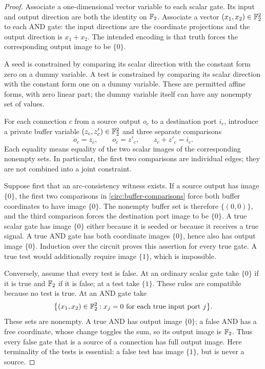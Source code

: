 \begin{proof}
Associate a one-dimensional vector variable to each scalar gate. Its input
and output direction are both the identity on $\mathbb{F}_2$. Associate a vector
$(x_1,x_2)\in\mathbb{F}_2^2$ to each AND gate: the input directions are the coordinate
projections and the output direction is $x_1+x_2$.
The intended encoding is that truth forces the corresponding output image
to be $\{0\}$.

A seed is constrained by comparing its scalar direction with the constant
form zero on a dummy variable. A test is constrained by comparing its scalar
direction with the constant form one on a dummy variable. These are permitted
affine forms, with zero linear part; the dummy variable itself can have any
nonempty set of values.

For each connection $c$ from a source output $o_c$ to a destination port
$i_c$, introduce a private buffer variable $(z_c,z'_c)\in\mathbb{F}_2^2$ and three
separate comparisons
\begin{equation}
\label{circ:buffer-comparisons}
 o_c=z_c,\qquad o_c=z'_c,\qquad z_c+z'_c=i_c.
\end{equation}
Each equality means equality of the two scalar images of the corresponding
nonempty sets. In particular, the first two comparisons are individual
edges; they are not combined into a joint constraint.

Suppose first that an arc-consistency witness exists. If a source output has
image $\{0\}$, the first two comparisons in
\eqref{circ:buffer-comparisons} force both buffer coordinates to have image
$\{0\}$. The nonempty buffer set is therefore $\{(0,0)\}$, and the third
comparison forces the destination port image to be $\{0\}$. A true scalar
gate has image $\{0\}$ either because it is seeded or because it receives a
true signal. A true AND gate has both coordinate images $\{0\}$, hence also
has output image $\{0\}$. Induction over the circuit proves this assertion
for every true gate. A true test would additionally require image $\{1\}$,
which is impossible.

Conversely, assume that every test is false. At an ordinary scalar gate take
$\{0\}$ if it is true and $\mathbb{F}_2$ if it is false; at a test take $\{1\}$.
These rules are compatible because no test is true. At an AND gate take
\[
 \bigl\{(x_1,x_2)\in\mathbb{F}_2^2:
       x_j=0\text{ for each true input port }j\bigr\}.
\]
These sets are nonempty. A true AND has output image $\{0\}$; a false AND
has a free coordinate, whose change toggles the sum, so its output image is
$\mathbb{F}_2$. Thus every false gate that is a source of a connection has full
output image. Here terminality of the tests is essential: a false test has
image $\{1\}$, but is never a source.


\end{proof}
